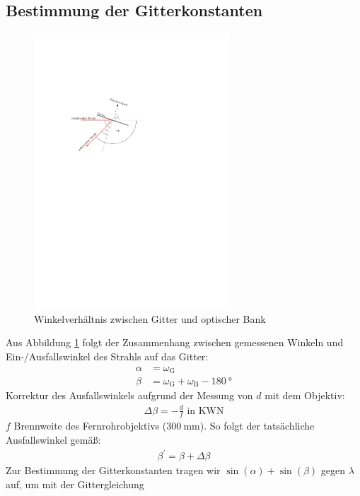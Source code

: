 \documentclass[11pt, a4paper]{article}
\numberwithin{equation}{section}
\begin{document}
\subsection{Bestimmung der Gitterkonstanten}
\begin{figure}[h]
	\centering
	\includegraphics[width=0.65\textwidth]{./figures/winkelverhaeltniss.pdf}
	\caption{Winkelverhältnis zwischen Gitter und optischer Bank}
	\label{fig:winkelverhaeltnis}
\end{figure}
Aus Abbildung \ref{fig:winkelverhaeltnis} folgt der Zusammenhang zwischen gemessenen Winkeln und Ein-/Ausfallswinkel des Strahls auf das Gitter: 
\begin{align*}
	\alpha &= \omega_\text{G} \\
	\beta &= \omega_\text{G} + \omega_\text{B} - \SI{180}{\degree}
	\label{eq:reflexionswinkel}
\end{align*}
Korrektur des Ausfallswinkels aufgrund der Messung von $d$ mit dem Objektiv:
\begin{align*}
\Delta \beta = -\frac{d}{f} \text{ in KWN}
\end{align*}
$f$ Brennweite des Fernrohrobjektivs ($\SI{300}{\milli\metre}$).
So folgt der tatsächliche Ausfallswinkel gemäß:
\begin{align*}
	\beta^\prime = \beta + \Delta \beta
\end{align*}
Zur Bestimmung der Gitterkonstanten tragen wir $\sin(\alpha) + \sin(\beta)$ gegen $\lambda$ auf, um mit der Gittergleichung
\end{document}
